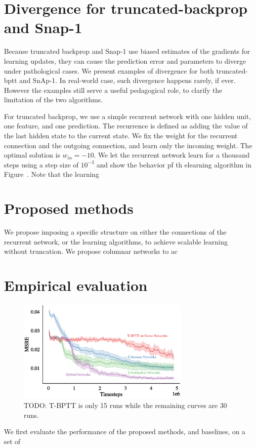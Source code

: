\documentclass[twoside,11pt]{article}
\begin{document}
\section{Divergence for truncated-backprop and Snap-1}
Because truncated backprop and Snap-1 use biased estimates of the gradients for learning updates, they can cause the prediction error and parameters to diverge under pathological cases. We present examples of divergence for both truncated-bptt and SnAp-1. In real-world case, such divergence happens rarely, if ever. However the examples still serve a useful pedagogical role, to clarify the limitation of the two algorithms. 

For truncated backprop, we use a simple recurrent network with one hidden unit, one feature, and one prediction. The recurrence is defined as adding the value of the last hidden state to the current state. We fix the weight for the recurrent connection and the outgoing connection, and learn only the incoming weight. The optimal solution is $w_{in} = -10$. We let the recurrent network learn for a thousand steps using a step size of $10^{-3}$ and show the behavior pf th elearning algorithm in Figure~. Note that the learning 
\section{Proposed methods} 
We propose imposing a specific structure on either the connections of the recurrent network, or the learning algorithms, to achieve scalable learning without truncation. We propose columnar networks to ac

\section{Empirical evaluation} 

\begin{figure}
	\centering
	\includegraphics[width=0.75\textwidth]{figures/plt_animal.eps}
	\caption{TODO: T-BPTT is only 15 runs while the remaining curves are 30 runs. }
\end{figure}
We first evaluate the performance of the proposed methods, and baselines, on a set of 
\end{document}
